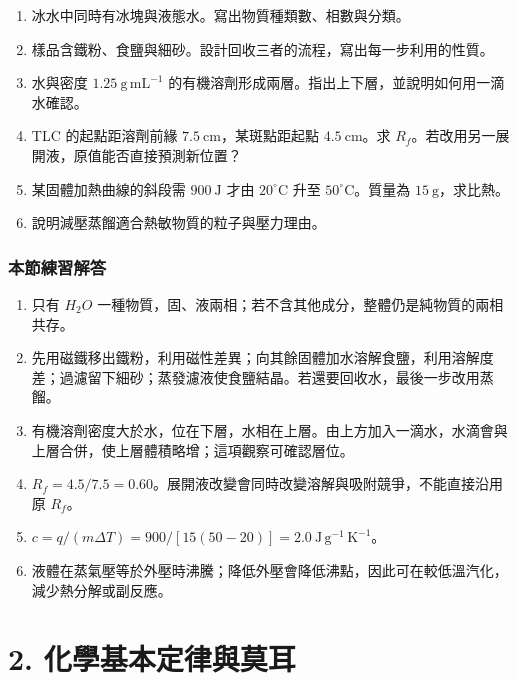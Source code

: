 \documentclass[11pt,a4paper]{article}
\providecommand{\tightlist}{%
  \setlength{\itemsep}{0pt}\setlength{\parskip}{0pt}}
\begin{document}
\begin{enumerate}
\def\labelenumi{\arabic{enumi}.}
\tightlist
\item
  冰水中同時有冰塊與液態水。寫出物質種類數、相數與分類。
\item
  樣品含鐵粉、食鹽與細砂。設計回收三者的流程，寫出每一步利用的性質。
\item
  水與密度 \(1.25\ \mathrm{g\,mL^{-1}}\) 的有機溶劑形成兩層。指出上下層，並說明如何用一滴水確認。
\item
  TLC 的起點距溶劑前緣 \(7.5\ \mathrm{cm}\)，某斑點距起點 \(4.5\ \mathrm{cm}\)。求 \(R_f\)。若改用另一展開液，原值能否直接預測新位置？
\item
  某固體加熱曲線的斜段需 \(900\ \mathrm J\) 才由 \(20^\circ\mathrm C\) 升至 \(50^\circ\mathrm C\)。質量為 \(15\ \mathrm g\)，求比熱。
\item
  說明減壓蒸餾適合熱敏物質的粒子與壓力理由。
\end{enumerate}

\subsubsection{本節練習解答}\label{ux672cux7bc0ux7df4ux7fd2ux89e3ux7b54}

\begin{enumerate}
\def\labelenumi{\arabic{enumi}.}
\tightlist
\item
  只有 \(H_2O\) 一種物質，固、液兩相；若不含其他成分，整體仍是純物質的兩相共存。
\item
  先用磁鐵移出鐵粉，利用磁性差異；向其餘固體加水溶解食鹽，利用溶解度差；過濾留下細砂；蒸發濾液使食鹽結晶。若還要回收水，最後一步改用蒸餾。
\item
  有機溶劑密度大於水，位在下層，水相在上層。由上方加入一滴水，水滴會與上層合併，使上層體積略增；這項觀察可確認層位。
\item
  \(R_f=4.5/7.5=0.60\)。展開液改變會同時改變溶解與吸附競爭，不能直接沿用原 \(R_f\)。
\item
  \(c=q/(m\Delta T)=900/[15(50-20)]=2.0\ \mathrm{J\,g^{-1}\,K^{-1}}\)。
\item
  液體在蒸氣壓等於外壓時沸騰；降低外壓會降低沸點，因此可在較低溫汽化，減少熱分解或副反應。
\end{enumerate}

\clearpage

\section{2. 化學基本定律與莫耳}\label{ux5316ux5b78ux57faux672cux5b9aux5f8bux8207ux83abux8033}
\end{document}
